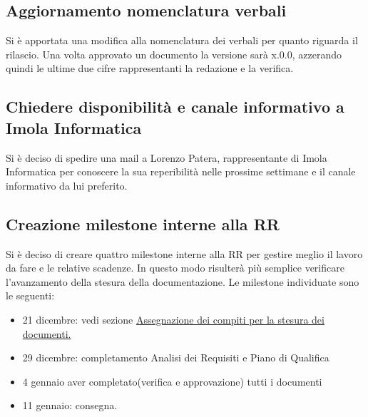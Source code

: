 \subsection*{Aggiornamento nomenclatura verbali}
      		Si è apportata una modifica alla nomenclatura dei verbali per quanto riguarda il rilascio.
      		Una volta approvato un documento la versione sarà x.0.0, azzerando quindi le ultime due cifre rappresentanti la redazione e la verifica.
      		


\subsection*{Chiedere disponibilità e canale informativo a Imola Informatica}
			Si è deciso di spedire una mail a Lorenzo Patera, rappresentante di Imola Informatica per conoscere la sua reperibilità nelle prossime settimane e il canale informativo da lui preferito.


\subsection*{Creazione milestone interne alla RR}
			Si è deciso di creare quattro milestone interne alla RR per gestire meglio il lavoro da fare e le relative scadenze.
			In questo modo risulterà più semplice verificare l'avanzamento della stesura della documentazione.
			Le milestone individuate sono le seguenti:
			\begin{itemize}
			\item 21 dicembre: vedi sezione \hyperlink{thesentence}{Assegnazione dei compiti per la stesura dei documenti.}
			\item 29 dicembre: completamento Analisi dei Requisiti e Piano di Qualifica
			\item 4 gennaio aver completato(verifica e approvazione) tutti i documenti
			\item 11 gennaio: consegna.
			\end{itemize}





